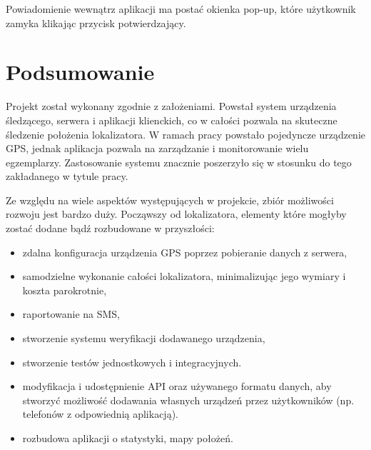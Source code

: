 \documentclass[eng,printmode]{mgr}
\begin{document}
Powiadomienie wewnątrz aplikacji ma postać okienka pop-up, które użytkownik zamyka klikając przycisk potwierdzający.





\chapter{Podsumowanie}
Projekt został wykonany zgodnie z założeniami. Powstał system urządzenia śledzącego, serwera i aplikacji klienckich, co w całości pozwala na skuteczne śledzenie położenia lokalizatora. W ramach pracy powstało pojedyncze urządzenie GPS, jednak aplikacja pozwala na zarządzanie i monitorowanie wielu egzemplarzy. Zastosowanie systemu znacznie poszerzyło się w stosunku do tego zakładanego w tytule pracy.

Ze względu na wiele aspektów występujących w projekcie, zbiór możliwości rozwoju jest bardzo duży. Począwszy od lokalizatora, elementy które mogłyby zostać dodane bądź rozbudowane w przyszłości:
\begin{itemize}
\item zdalna konfiguracja urządzenia GPS poprzez pobieranie danych z serwera,
\item samodzielne wykonanie całości lokalizatora, minimalizując jego wymiary i koszta parokrotnie,
\item raportowanie na SMS,
\item stworzenie systemu weryfikacji dodawanego urządzenia,
\item stworzenie testów jednostkowych i integracyjnych.
\item modyfikacja i udostępnienie API oraz używanego formatu danych, aby stworzyć możliwość dodawania własnych urządzeń przez użytkowników (np. telefonów z odpowiednią aplikacją).
\item rozbudowa aplikacji o statystyki, mapy położeń.
\end{itemize}

 
\end{document}
